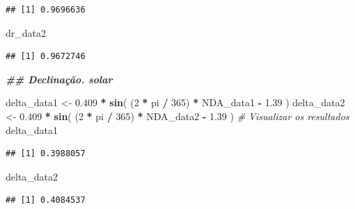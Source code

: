 \documentclass[
]{article}
\newenvironment{Shaded}{\begin{snugshade}}{\end{snugshade}}
\newcommand{\CommentTok}[1]{\textcolor[rgb]{0.56,0.35,0.01}{\textit{#1}}}
\newcommand{\DecValTok}[1]{\textcolor[rgb]{0.00,0.00,0.81}{#1}}
\newcommand{\DocumentationTok}[1]{\textcolor[rgb]{0.56,0.35,0.01}{\textbf{\textit{#1}}}}
\newcommand{\FloatTok}[1]{\textcolor[rgb]{0.00,0.00,0.81}{#1}}
\newcommand{\FunctionTok}[1]{\textcolor[rgb]{0.13,0.29,0.53}{\textbf{#1}}}
\newcommand{\NormalTok}[1]{#1}
\newcommand{\OtherTok}[1]{\textcolor[rgb]{0.56,0.35,0.01}{#1}}
\newcommand{\SpecialCharTok}[1]{\textcolor[rgb]{0.81,0.36,0.00}{\textbf{#1}}}
\begin{document}
\begin{verbatim}
## [1] 0.9696636
\end{verbatim}

\begin{Shaded}
\begin{Highlighting}[]
\NormalTok{dr\_data2}
\end{Highlighting}
\end{Shaded}

\begin{verbatim}
## [1] 0.9672746
\end{verbatim}

\begin{Shaded}
\begin{Highlighting}[]
\DocumentationTok{\#\# Declinação. solar}

\NormalTok{delta\_data1 }\OtherTok{\textless{}{-}} \FloatTok{0.409} \SpecialCharTok{*} \FunctionTok{sin}\NormalTok{(}
\NormalTok{  (}\DecValTok{2} \SpecialCharTok{*}\NormalTok{ pi }\SpecialCharTok{/} \DecValTok{365}\NormalTok{) }\SpecialCharTok{*}\NormalTok{ NDA\_data1 }\SpecialCharTok{{-}} \FloatTok{1.39}
\NormalTok{)}
\NormalTok{delta\_data2 }\OtherTok{\textless{}{-}} \FloatTok{0.409} \SpecialCharTok{*} \FunctionTok{sin}\NormalTok{(}
\NormalTok{  (}\DecValTok{2} \SpecialCharTok{*}\NormalTok{ pi }\SpecialCharTok{/} \DecValTok{365}\NormalTok{) }\SpecialCharTok{*}\NormalTok{ NDA\_data2 }\SpecialCharTok{{-}} \FloatTok{1.39}
\NormalTok{)}
\CommentTok{\# Visualizar os resultados}
\NormalTok{delta\_data1}
\end{Highlighting}
\end{Shaded}

\begin{verbatim}
## [1] 0.3988057
\end{verbatim}

\begin{Shaded}
\begin{Highlighting}[]
\NormalTok{delta\_data2}
\end{Highlighting}
\end{Shaded}

\begin{verbatim}
## [1] 0.4084537
\end{verbatim}
\end{document}
